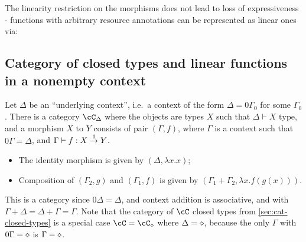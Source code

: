 \documentclass[12pt,a4paper]{article}
\begin{document}
The linearity restriction on the morphisms does not lead to loss of expressiveness - functions with arbitrary resource annotations can be represented as linear ones via:

\subsection{Category of closed types and linear functions in a nonempty context}

Let $\Delta$ be an ``underlying context'', i.e.\ a context of the form $\Delta = 0\Gamma_0$ for some $\Gamma_0$. There is a category $\cC_\Delta$ where the objects are types $X$ such that $\Delta \vdash X \text{ type}$, and a morphism $X$ to $Y$ consists of pair $(\Gamma, f)$, where $\Gamma$ is a context such that $0\Gamma = \Delta$, and $\Gamma \vdash f : X \overset{1}{\to} Y$.

\begin{itemize}
\item The identity morphism is given by $(\Delta, \lambda x . x)$;
\item Composition of $(\Gamma_2, g)$ and $(\Gamma_1, f)$ is given by $(\Gamma_1 + \Gamma_2, \lambda x . f(g(x)))$.
\end{itemize}

This is a category since $0\Delta = \Delta$, and context addition is associative, and with $\Gamma + \Delta = \Delta + \Gamma = \Gamma$. Note that the category of $\cC$ closed types from \cref{sec:cat-closed-types} is a special case $\cC = \cC_{\emptyCtxt}$ where $\Delta = \diamond$, because the only $\Gamma$ with $0\Gamma = \diamond$ is $\Gamma = \diamond$.
\end{document}
